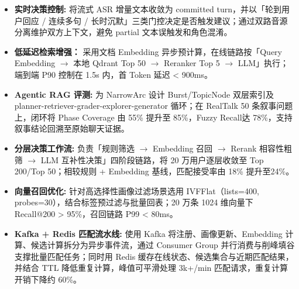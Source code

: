 

\begin{itemize}[itemsep=0.5ex, parsep=0ex]
    \item \textbf{实时决策控制:} 将流式 ASR 增量文本收敛为 committed turn，并以「轮到用户回应 / 连续多句 / 长时沉默」三类门控决定是否触发建议；通过双路音源分离维护双方上下文，避免 partial 文本误触发和角色混淆。
    \item \textbf{低延迟检索增强：} 采用文档 Embedding 异步预计算，在线链路按「Query Embedding $\rightarrow$ 本地 Qdrant Top 50 $\rightarrow$ Reranker Top 5 $\rightarrow$ LLM」执行；端到端 P90 控制在 1.5s 内，首 Token 延迟 < 900ms。
    \item \textbf{Agentic RAG 评测:} 为 NarrowArc 设计 Burst/TopicNode 双层索引及 planner-retriever-grader-explorer-generator 循环；在 RealTalk 50 条叙事问题上，闭环将 Phase Coverage 由 55\% 提升至 85\%，Fuzzy Recall达 78\%，支持叙事结论回溯至原始聊天证据。
\end{itemize}

\begin{itemize}[itemsep=0.5ex, parsep=0ex]
    \item \textbf{分层决策工作流:} 负责「规则筛选 $\rightarrow$ Embedding 召回 $\rightarrow$ Rerank 相容性粗筛 $\rightarrow$ LLM 互补性决策」四阶段链路，将 20 万用户逐层收敛至 Top 200/Top 50；相较规则 + Embedding 基线，匹配接受率由 18\% 提升至24\%。
    \item \textbf{向量召回优化:} 针对高选择性画像过滤场景选用 IVFFlat（lists=400, probes=30），结合标签预过滤与批量回表；20 万条 1024 维向量下 Recall@200 > 95\%，召回链路 P99 < 80ms。
    \item \textbf{Kafka + Redis 匹配流水线:} 使用 Kafka 将注册、画像更新、Embedding 计算、候选计算拆分为异步事件流，通过 Consumer Group 并行消费与削峰填谷支撑批量匹配任务；同时用 Redis 缓存在线状态、候选集合与近期匹配结果，并结合 TTL 降低重复计算，峰值可平滑处理 3k+/min 匹配请求，重复计算开销下降约 60\%。
\end{itemize}

